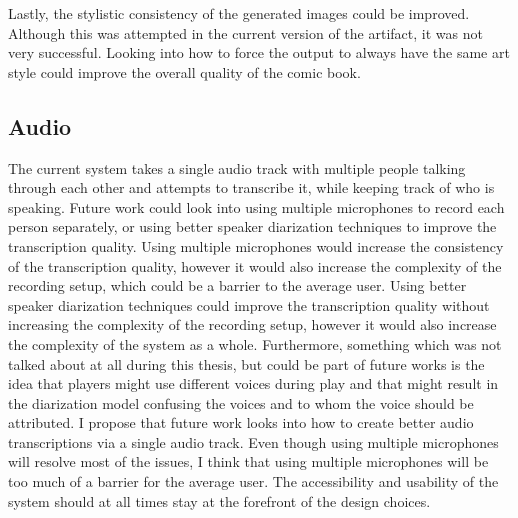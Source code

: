 Lastly, the stylistic consistency of the generated images could be improved. Although this was attempted in the current version of the artifact, it was not very successful. Looking into how to force the output to always have the same art style could improve the overall quality of the comic book.

\subsection*{Audio}
The current system takes a single audio track with multiple people talking through each other and attempts to transcribe it, while keeping track of who is speaking. Future work could look into using multiple microphones to record each person separately, or using better speaker diarization techniques to improve the transcription quality. Using multiple microphones would increase the consistency of the transcription quality, however it would also increase the complexity of the recording setup, which could be a barrier to the average user. Using better speaker diarization techniques could improve the transcription quality without increasing the complexity of the recording setup, however it would also increase the complexity of the system as a whole. Furthermore, something which was not talked about at all during this thesis, but could be part of future works is the idea that players might use different voices during play and that might result in the diarization model confusing the voices and to whom the voice should be attributed. I propose that future work looks into how to create better audio transcriptions via a single audio track. Even though using multiple microphones will resolve most of the issues, I think that using multiple microphones will be too much of a barrier for the average user. The accessibility and usability of the system should at all times stay at the forefront of the design choices.

